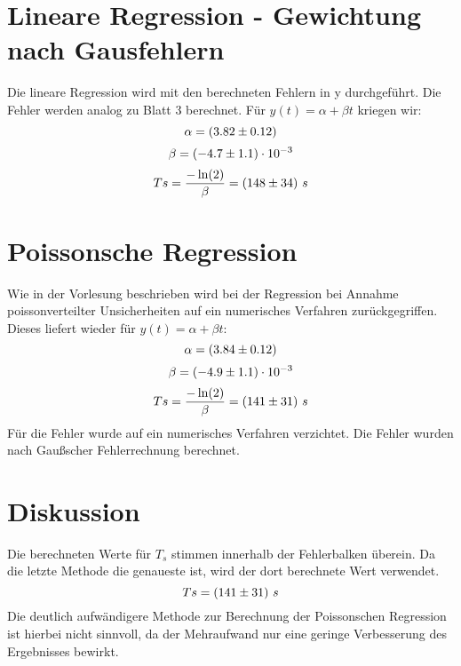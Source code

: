 \documentclass[11pt]{article}
\begin{document}
   

    \section{Lineare Regression - Gewichtung nach Gausfehlern}
    Die lineare Regression wird mit den berechneten Fehlern in y durchgeführt. Die Fehler werden analog zu Blatt 3 berechnet.
    Für $y(t) = \alpha + \beta t$ kriegen wir:
    \begin{equation*}
        \alpha = (3.82 \pm 0.12)
    \end{equation*}
    \begin{equation*}
        \beta = (-4.7 \pm 1.1) \cdot 10^{-3}
    \end{equation*}
    \begin{equation*}
        Ts =\frac{-\ln(2)}{\beta}= (148 \pm 34)\ s
    \end{equation*}

    \section{Poissonsche Regression}
    Wie in der Vorlesung beschrieben wird bei der Regression bei Annahme poissonverteilter Unsicherheiten auf ein numerisches Verfahren zurückgegriffen. Dieses liefert wieder für $y(t) = \alpha + \beta t$:
    \begin{equation*}
        \alpha = (3.84 \pm 0.12)
    \end{equation*}
    \begin{equation*}
        \beta = (-4.9 \pm 1.1) \cdot 10^{-3}
    \end{equation*}
    \begin{equation*}
        Ts =\frac{-\ln(2)}{\beta}= (141 \pm 31)\ s
    \end{equation*}
    Für die Fehler wurde auf ein numerisches Verfahren verzichtet. Die Fehler wurden nach Gaußscher Fehlerrechnung berechnet.
    
    \section{Diskussion}
    Die berechneten Werte für {$T_s$} stimmen innerhalb der Fehlerbalken überein. Da die letzte Methode die genaueste ist, wird der dort berechnete Wert verwendet.
    \begin{equation*}
        Ts = (141 \pm 31)\ s
    \end{equation*}
   Die deutlich aufwändigere Methode zur Berechnung der Poissonschen Regression ist hierbei nicht sinnvoll, da der Mehraufwand nur eine geringe Verbesserung des Ergebnisses bewirkt.
    
\end{document}
